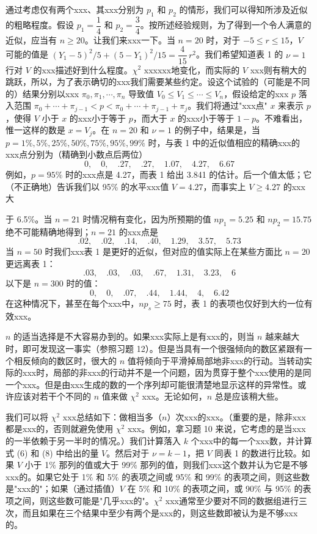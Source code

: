 通过考虑仅有两个xxx、其xxx分别为 $p_1$ 和 $p_2$ 的情形，我们可以得知所涉及近似的粗略程度。假设 $p_1 = \dfrac{1}{4}$ 和 $p_2 = \dfrac{3}{4}$。按所述经验规则，为了得到一个令人满意的近似，应当有 $n \geqslant 20$。让我们来xxx一下。当 $n = 20$ 时，对于 $-5 \leqslant r \leqslant 15$，$V$ 可能的值是 $(Y_1 - 5)^2 / 5 + (5 - Y_1)^2 / 15 = \dfrac{4}{15}\,r^2$。我们希望知道表 1 的 $\nu = 1$ 行对 $V$ 的xxx描述好到什么程度。$\chi^2$ xxxxxx地变化，而实际的 $V$ xxx则有稍大的跳跃，所以，为了表示确切的xxx我们需要某些约定。设这个试验的（可能是不同的）结果分别以xxx $\pi_0, \pi_1, \cdots, \pi_n$ 导致值 $V_0 \leqslant V_1 \leqslant \cdots \leqslant V_n$，假设给定的xxx $p$ 落入范围 $\pi_0 + \cdots + \pi_{j-1} < p < \pi_0 + \cdots + \pi_{j-1} + \pi_j$。我们将通过"xxx点" $x$ 来表示 $p$，使得 $V$ 小于 $x$ 的xxx小于等于 $p$，而大于 $x$ 的xxx小于等于 $1 - p$。不难看出，惟一这样的数是 $x = V_j$。在 $n = 20$ 和 $\nu = 1$ 的例子中，结果是，当 $p = 1\%, 5\%, 25\%, 50\%, 75\%, 95\%, 99\%$ 时，与表 1 中的近似值相应的精确xxx的xxx点分别为（精确到小数点后两位）
\[
0, \quad 0, \quad .27, \quad .27, \quad 1.07, \quad 4.27, \quad 6.67
\]
例如，$p = 95\%$ 时的xxx点是 4.27，而表 1 给出 3.841 的估计。后一个值太低；它（不正确地）告诉我们以 95\% 的水平xxx值 $V = 4.27$，而事实上 $V \geqslant 4.27$ 的xxx大

\noindent 于 6.5\%。当 $n = 21$ 时情况稍有变化，因为所预期的值 $np_1 = 5.25$ 和 $np_2 = 15.75$ 绝不可能精确地得到；$n = 21$ 的xxx点是
\[
.02, \quad .02, \quad .14, \quad .40, \quad 1.29, \quad 3.57, \quad 5.73
\]
当 $n = 50$ 时我们xxx表 1 是更好的近似，但对应的值实际上在某些方面比 $n = 20$ 更远离表 1：
\[
.03, \quad .03, \quad .03, \quad .67, \quad 1.31, \quad 3.23, \quad 6
\]
以下是 $n = 300$ 时的值：
\[
0, \quad 0, \quad .07, \quad .44, \quad 1.44, \quad 4, \quad 6.42
\]
在这种情况下，甚至在每个xxx中，$np_s \geqslant 75$ 时，表 1 的表项也仅好到大约一位有效xxx。

$n$ 的适当选择是不大容易办到的。如果xxx实际上是有xxx的，则当 $n$ 越来越大时，即可发现这一事实（参照习题 12）。但是当具有一个很强倾向的数区紧跟有一个相反倾向的数区时，很大的 $n$ 值将倾向于平滑掉局部地非xxx的行动。当转动实际的xxx时，局部的非xxx的行动并不是一个问题，因为贯穿于整个xxx使用的是同一个xxx。但是由xxx生成的数的一个序列却可能很清楚地显示这样的异常性。或许应该对若干个不同的 $n$ 值来做 $\chi^2$ xxx。无论如何，$n$ 总是应该稍大些。

我们可以将 $\chi^2$ xxx总结如下：做相当多（$n$）次xxx的xxx。（重要的是，除非xxx都是xxx的，否则就避免使用 $\chi^2$ xxx。例如，拿习题 10 来说，它考虑的是当xxx的一半依赖于另一半时的情况。）我们计算落入 $k$ 个xxx中的每一个xxx数，并计算式 (6) 和 (8) 中给出的量 $V$。然后对于 $\nu = k - 1$，把 $V$ 同表 1 的数进行比较。如果 $V$ 小于 1\% 那列的值或大于 99\% 那列的值，则我们xxx这个数并认为它是不够xxx的。如果它处于 1\% 和 5\% 的表项之间或 95\% 和 99\% 的表项之间，则这些数是"xxx的"；如果（通过插值）$V$ 在 5\% 和 10\% 的表项之间，或 90\% 与 95\% 的表项之间，则这些数可能是"几乎xxx的"。$\chi^2$ xxx通常至少要对不同的数据组进行三次，而且如果在三个结果中至少有两个是xxx的，则这些数即被认为是不够xxx的。

